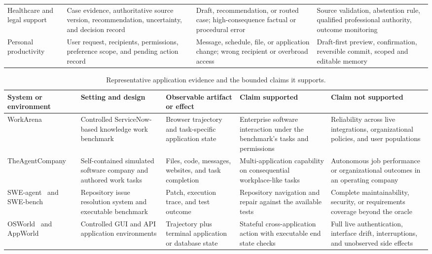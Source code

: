\begin{table}[!htbp]
\begin{tabularx}{\textwidth}{L{2.45cm}Y Y Y}
Healthcare and legal support & Case evidence, authoritative source version, recommendation, uncertainty, and decision record & Draft, recommendation, or routed case; high-consequence factual or procedural error & Source validation, abstention rule, qualified professional authority, outcome monitoring \\
Personal productivity & User request, recipients, permissions, preference scope, and pending action record & Message, schedule, file, or application change; wrong recipient or overbroad access & Draft-first preview, confirmation, reversible commit, scoped and editable memory \\
\bottomrule
\end{tabularx}
\end{table}

\begin{table}[!htbp]
\centering
\caption{Representative application evidence and the bounded claims it supports.}
\label{tab:application-evidence}
\small
\surveytableformat
\begin{tabularx}{\textwidth}{L{2.35cm}L{2.65cm}L{3.05cm}L{3.15cm}Y}
\toprule
{}\textbf{System or environment} & \textbf{Setting and design} & \textbf{Observable artifact or effect} & \textbf{Claim supported} & \textbf{Claim not supported} \\
\midrule
WorkArena\newline\cite{drouin2024workarena} & Controlled ServiceNow-based knowledge work benchmark & Browser trajectory and task-specific application state & Enterprise software interaction under the benchmark's tasks and permissions & Reliability across live integrations, organizational policies, and user populations \\
TheAgent\-Company\newline\cite{xu2025agentcompany} & Self-contained simulated software company and authored work tasks & Files, code, messages, websites, and task completion & Multi-application capability on consequential workplace-like tasks & Autonomous job performance or organizational outcomes in an operating company \\
SWE-agent~\cite{yang2024sweagent} and SWE-bench~\cite{jimenez2024swebench} & Repository issue resolution system and executable benchmark & Patch, execution trace, and test outcome & Repository navigation and repair against the available tests & Complete maintainability, security, or requirements coverage beyond the oracle \\
OSWorld~\cite{xie2024osworld} and AppWorld~\cite{trivedi2024appworld} & Controlled GUI and API application environments & Trajectory plus terminal application or database state & Stateful cross-application action with executable end state checks & Full live authentication, interface drift, interruptions, and unobserved side effects \\

\end{tabularx}
\end{table}
